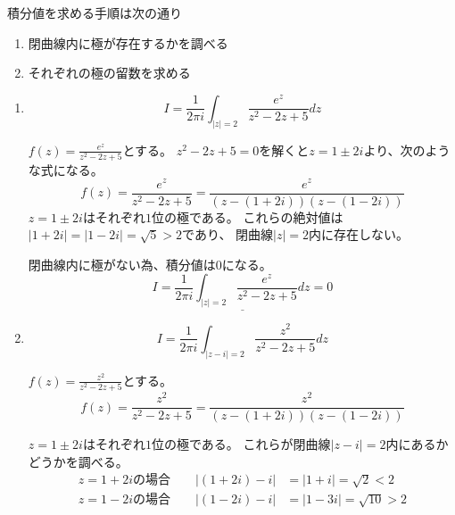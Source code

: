\documentclass[10pt,b5paper]{ltjsarticle}
\begin{document}
\hrulefill

積分値を求める手順は次の通り

\begin{enumerate}
 \item 閉曲線内に極が存在するかを調べる
 \item それぞれの極の留数を求める
\end{enumerate}
 \hrulefill
\begin{enumerate}\renewcommand{\theenumi}{(\arabic{enumi})}
 \item
      \begin{equation}
       I = \frac{1}{2\pi i}\int_{\lvert z \rvert = 2}\frac{e^z}{z^2-2z+5}dz
      \end{equation}

      $f(z)=\frac{e^z}{z^2-2z+5}$とする。
      $z^2-2z+5=0$を解くと$z=1\pm 2i$より、次のような式になる。
      \begin{equation}
       f(z)=\frac{e^z}{z^2-2z+5}=\frac{e^z}{(z-(1+2i))(z-(1-2i))}
      \end{equation}
      $z=1\pm 2i$はそれぞれ$1$位の極である。
      これらの絶対値は$\lvert 1+2i\lvert = \rvert 1-2i\lvert = \sqrt{5}>2$であり、
      閉曲線$\lvert z \rvert =2$内に存在しない。

      閉曲線内に極がない為、積分値は$0$になる。
      \begin{equation}
       \underline{
        I = \frac{1}{2\pi i}\int_{\lvert z \rvert = 2}\frac{e^z}{z^2-2z+5}dz =0
        }
      \end{equation}
 \hrulefill
 \item
      \begin{equation}
       I = \frac{1}{2\pi i}\int_{\lvert z-i \rvert = 2}\frac{z^2}{z^2-2z+5}dz
      \end{equation}

      $f(z)=\frac{z^2}{z^2-2z+5}$とする。
      \begin{equation}
       f(z)=\frac{z^2}{z^2-2z+5}=\frac{z^2}{(z-(1+2i))(z-(1-2i))}
      \end{equation}

      $z=1\pm 2i$はそれぞれ$1$位の極である。
      これらが閉曲線$\lvert z-i\lvert=2$内にあるかどうかを調べる。
      \begin{align}
       z=1+2iの場合 \qquad \lvert (1+2i) -i\lvert &= \lvert 1+i \rvert =\sqrt{2} < 2\\
       z=1-2iの場合 \qquad \lvert (1-2i) -i\lvert &= \lvert 1-3i \rvert =\sqrt{10} > 2
      \end{align}


\end{enumerate}
\end{document}
